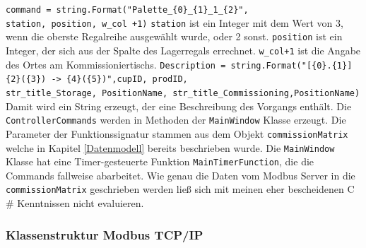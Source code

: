 \newline
\verb|command = string.Format("Palette_{0}_{1}_1_{2}",|\\
\verb|station, position, w_col +1)|
\newline
\newline
\verb|station| ist ein Integer mit dem Wert von 3, wenn die oberste Regalreihe ausgewählt wurde, oder 2 sonst.
\verb|position| ist ein Integer, der sich aus der Spalte des Lagerregals errechnet.
\verb|w_col+1| ist die Angabe des Ortes am Kommissioniertischs.
\newline
\newline
\verb|Description = string.Format("[{0}.{1}] {2}({3}) -> {4}({5})",cupID, prodID, |\\
\verb|str_title_Storage, PositionName, str_title_Commissioning,PositionName)|
\newline
\newline
Damit wird ein String erzeugt, der eine Beschreibung des Vorgangs enthält.
Die \verb|ControllerCommands| werden in Methoden der \verb|MainWindow| Klasse erzeugt.
Die Parameter der Funktionssignatur stammen aus dem Objekt \verb|commissionMatrix| welche in Kapitel \ref{Datenmodell}
bereits beschrieben wurde.
Die \verb|MainWindow| Klasse hat eine Timer-gesteuerte Funktion \verb|MainTimerFunction|, die die Commands
fallweise abarbeitet.
Wie genau die Daten vom Modbus Server in die \verb|commissionMatrix| geschrieben werden ließ sich mit meinen eher
bescheidenen C$\#$ Kenntnissen nicht evaluieren.
\newpage

\subsubsection{Klassenstruktur Modbus TCP/IP}


